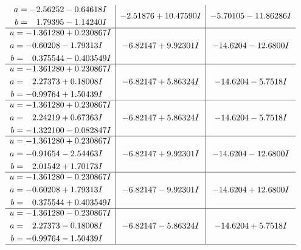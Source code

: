 \documentclass[1p]{elsarticle_modified}
\theoremstyle{definition}
\begin{document}
$$\begin{array}{c|c|c}
\begin{aligned}
a &= -2.56252 - 0.64618 I \\
b &= \phantom{-}1.79395 - 1.14240 I\end{aligned}
 & -2.51876 + 10.47590 I & -5.70105 - 11.86286 I \\ \hline\begin{aligned}
u &= -1.361280 + 0.230867 I \\
a &= -0.60208 - 1.79313 I \\
b &= \phantom{-}0.375544 - 0.403549 I\end{aligned}
 & -6.82147 + 9.92301 I & -14.6204 - 12.6800 I \\ \hline\begin{aligned}
u &= -1.361280 + 0.230867 I \\
a &= \phantom{-}2.27373 + 0.18008 I \\
b &= -0.99764 + 1.50439 I\end{aligned}
 & -6.82147 + 5.86324 I & -14.6204 - 5.7518 I \\ \hline\begin{aligned}
u &= -1.361280 + 0.230867 I \\
a &= \phantom{-}2.24219 + 0.67363 I \\
b &= -1.322100 - 0.082847 I\end{aligned}
 & -6.82147 + 5.86324 I & -14.6204 - 5.7518 I \\ \hline\begin{aligned}
u &= -1.361280 + 0.230867 I \\
a &= -0.91654 - 2.54463 I \\
b &= \phantom{-}2.01542 + 1.70173 I\end{aligned}
 & -6.82147 + 9.92301 I & -14.6204 - 12.6800 I \\ \hline\begin{aligned}
u &= -1.361280 - 0.230867 I \\
a &= -0.60208 + 1.79313 I \\
b &= \phantom{-}0.375544 + 0.403549 I\end{aligned}
 & -6.82147 - 9.92301 I & -14.6204 + 12.6800 I \\ \hline\begin{aligned}
u &= -1.361280 - 0.230867 I \\
a &= \phantom{-}2.27373 - 0.18008 I \\
b &= -0.99764 - 1.50439 I\end{aligned}
 & -6.82147 - 5.86324 I & -14.6204 + 5.7518 I\\
 \hline 
 \end{array}$$\newpage$$\begin{array}{c|c|c}  

\end{array}$$
\end{document}
